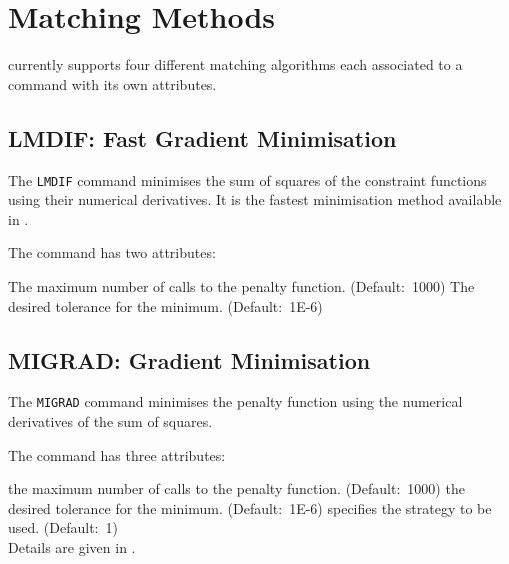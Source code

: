 

%

\section{Matching Methods}
\label{sec:match-methods}

\madx currently supports four different matching algorithms each associated to 
a command with its own attributes. 

\subsection{LMDIF: Fast Gradient Minimisation}
\label{subsec:match-lmdif}
The \texttt{LMDIF} command minimises the sum of squares of the constraint
functions using their numerical derivatives. It is the fastest
minimisation method available in \madx.
 

The command has two attributes:  
\begin{madlist}
    The maximum number of calls to the penalty
   function. (Default:~1000) 
    The desired tolerance for the minimum. 
   (Default:~1E-6)  
\end{madlist}

\subsection{MIGRAD: Gradient Minimisation}
\label{subsec:match-migrad}
The \texttt{MIGRAD} command minimises the penalty function using the numerical
derivatives of the sum of squares.  


The command has three attributes: 
\begin{madlist}
    the maximum number of calls to the penalty
   function. (Default:~1000) 
    the desired tolerance for the minimum. 
   (Default:~1E-6)
    specifies the strategy to be used. (Default:~1) \\
   Details are given in \cite{MINUIT}.  
\end{madlist} 


